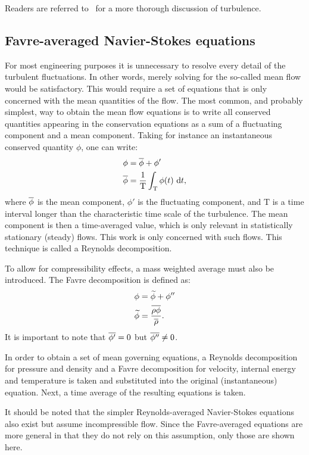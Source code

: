 Readers are referred to~\cite{pope2001turbulent,wilcox1998turbulence} for a more thorough discussion of turbulence.
%
\subsection{Favre-averaged Navier-Stokes equations}
%
For most engineering purposes it is unnecessary to resolve every detail of the turbulent fluctuations. In other words, merely solving for the so-called mean flow would be satisfactory. This would require a set of equations that is only concerned with the mean quantities of the flow. The most common, and probably simplest, way to obtain the mean flow equations is to write all conserved quantities appearing in the conservation equations as a sum of a fluctuating component and a mean component. Taking for instance an instantaneous conserved quantity $\phi$, one can write:
\begin{align*}
    \phi &= \overline{\phi} + \phi'\\
    \overline{\phi} &= \frac{1}{\text{T}} \int_{\text{T}}\phi(t)
        ~\text{d}t,
\end{align*}
where $\overline{\phi}$ is the mean component, $\phi'$ is the fluctuating component, and $\text{T}$ is a time interval longer than the characteristic time scale of the turbulence. The mean component is then a time-averaged value, which is only relevant in statistically stationary (steady) flows. This work is only concerned with such flows. This technique is called a Reynolds decomposition.

To allow for compressibility effects, a mass weighted average must also be introduced. The Favre decomposition is defined as:
\begin{align*}
    \phi &= \widetilde{\phi} + \phi'' \\
    \widetilde{\phi} &= \frac{\overline{\rho\phi}}{\overline{\rho}}.
\end{align*}
It is important to note that $\overline{\phi'} = 0$ but $\overline{\phi''} \ne 0$.

In order to obtain a set of mean governing equations, a Reynolds decomposition for pressure and density and a Favre decomposition for velocity, internal energy and temperature is taken and substituted into the original (instantaneous) equation. Next, a time average of the resulting equations is taken.

It should be noted that the simpler Reynolds-averaged Navier-Stokes equations also exist but assume incompressible flow. Since the Favre-averaged equations are more general in that they do not rely on this assumption, only those are shown here.
%
